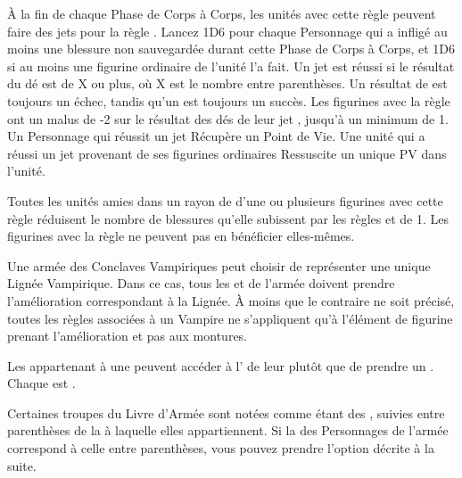 \vspace*{5pt}À la fin de chaque Phase de Corps à Corps, les unités avec cette règle peuvent faire des jets pour la règle \vampiric{}. Lancez 1D6 pour chaque Personnage \vampiric{} qui a infligé au moins une blessure non sauvegardée durant cette Phase de Corps à Corps, et 1D6 si au moins une figurine ordinaire \vampiric{} de l'unité l'a fait. Un jet \vampiric{} est réussi si le résultat du dé est de X ou plus, où X est le nombre entre parenthèses. Un résultat de  est toujours un échec, tandis qu'un  est toujours un succès. Les figurines avec la règle \largetarget{} ont un malus de -2 sur le résultat des dés de leur jet \vampiric{}, jusqu'à un minimum de 1. Un Personnage qui réussit un jet \vampiric{} Récupère un Point de Vie. Une unité qui a réussi un jet \vampiric{} provenant de ses figurines ordinaires Ressuscite un unique PV dans l'unité.

\armyspecialruleentry{\necromanticaura}

Toutes les unités amies dans un rayon de  d'une ou plusieurs figurines avec cette règle réduisent le nombre de blessures qu'elle subissent par les règles \ashestoashes{} et \unstable{} de 1. Les figurines avec la règle \necromanticaura{} ne peuvent pas en bénéficier elles-mêmes.


\closearmyspecialrules







\newpage
{}

\spaceaftersection{}

Une armée des Conclaves Vampiriques peut choisir de représenter une unique Lignée Vampirique. Dans ce cas, tous les \vampirelords{} et \vampireheroes{} de l'armée doivent prendre l'amélioration correspondant à la Lignée. À moins que le contraire ne soit précisé, toutes les règles associées à un Vampire ne s'appliquent qu'à l'élément de figurine prenant l'amélioration et pas aux montures.

\armynewsubsection{\ancientbloodpower}

Les \vampirelords{} appartenant à une \bloodline{} peuvent accéder à l'\ancientbloodpower{} de leur \bloodline{} plutôt que de prendre un \bloodpower{}. Chaque \ancientbloodpower{} est \oneofakind{}.


Certaines troupes du Livre d'Armée sont notées comme étant des \bloodties{}, suivies entre parenthèses de la \bloodline{} à laquelle elles appartiennent. Si la \bloodline{} des Personnages \vampires{} de l'armée correspond à celle entre parenthèses, vous pouvez prendre l'option décrite à la suite.

